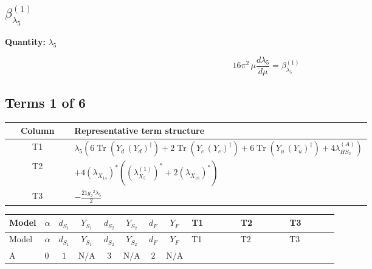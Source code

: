 \documentclass[8pt]{article}
\begin{document}
\begin{landscape}
\section*{$\beta_{\lambda_5}^{(1)}$}
\noindent\textbf{Quantity: }$\lambda_5$\par\smallskip
\[16\pi^2\,\mu\frac{d \lambda_5}{d\mu}=\beta_{\lambda_5}^{(1)}\]
\subsection*{Terms 1 of 6}
\begin{center}
\begin{tabular}{@{}c >{\raggedright\arraybackslash}p{0.82\linewidth}@{}}
\toprule
Column & Representative term structure \\
\midrule
T1 & \(\displaystyle {\lambda_5} (6 \operatorname{Tr}\!\left({Y_d}\,\left({Y_d}\right)^{\dagger}\right)+2 \operatorname{Tr}\!\left({Y_e}\,\left({Y_e}\right)^{\dagger}\right)+6 \operatorname{Tr}\!\left({Y_u}\,\left({Y_u}\right)^{\dagger}\right)+4 {\lambda_{HS_2}^{(A)}})\) \\
\midrule
T2 & \(\displaystyle +4 \left({\lambda_{X_{14}}}\right)^{*} (\left({\lambda_{X_{5}}^{(1)}}\right)^{*}+2 \left({\lambda_{X_{18}}}\right)^{*})\) \\
\midrule
T3 & \(\displaystyle -\frac{21 {g_2}^2 {\lambda_5}}{2}\) \\
\midrule
\bottomrule
\end{tabular}
\end{center}
\smallskip
\tiny
\begin{longtable}{@{}llcccccc >{\raggedright\arraybackslash}p{0.21\linewidth} >{\raggedright\arraybackslash}p{0.21\linewidth} >{\raggedright\arraybackslash}p{0.21\linewidth}@{}}
\toprule
Model & $\alpha$ & $d_{S_1}$ & $Y_{S_1}$ & $d_{S_2}$ & $Y_{S_2}$ & $d_F$ & $Y_F$ & T1 & T2 & T3 \\
\midrule
\endfirsthead
\toprule
Model & $\alpha$ & $d_{S_1}$ & $Y_{S_1}$ & $d_{S_2}$ & $Y_{S_2}$ & $d_F$ & $Y_F$ & T1 & T2 & T3 \\
\midrule
\endhead
A & $0$ & $1$ & $\text{N/A}$ & $3$ & $\text{N/A}$ & $2$ & $\text{N/A}$ & \scriptsize\adjustbox{max width=\linewidth}{$\begin{gathered} {\lambda_5} (6 \operatorname{Tr}\!\left({Y_d}\,\left({Y_d}\right)^{\dagger}\right)+2 \operatorname{Tr}\!\left({Y_e}\,\left({Y_e}\right)^{\dagger}\right)+6 \operatorname{Tr}\!\left({Y_u}\,\left({Y_u}\right)^{\dagger}\right)+4 {\lambda_{HS_2}^{(A)}})\end{gathered}$} & \scriptsize\adjustbox{max width=\linewidth}{$\begin{gathered} +4 \left({\lambda_{X_{14}}}\right)^{*} (\left({\lambda_{X_{5}}^{(1)}}\right)^{*}+2 \left({\lambda_{X_{18}}}\right)^{*})\end{gathered}$} & \scriptsize\adjustbox{max width=\linewidth}{$\begin{gathered} -\frac{21 {g_2}^2 {\lambda_5}}{2}\end{gathered}$} \\

\end{longtable}
\end{landscape}
\end{document}
